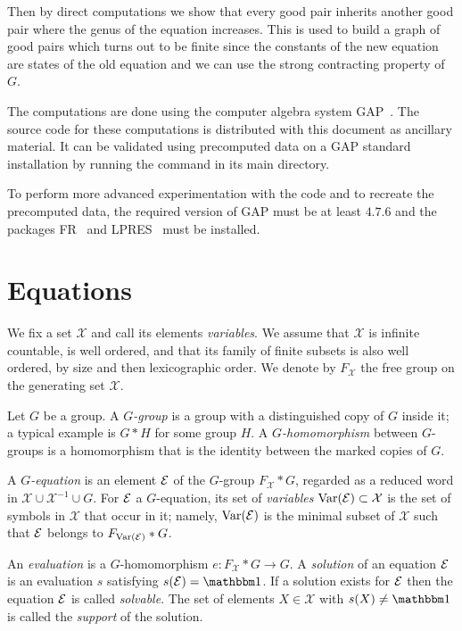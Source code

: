 \documentclass[a4paper,11pt]{amsart}
\begin{document}
Then by direct computations we show that every good pair inherits
another good pair where the genus of the equation increases.
This is used to build a graph of good pairs which turns out 
to be finite since the constants of the new equation are states
of the old equation and we can use the strong contracting property
of $G$. 

The computations are done
 using the computer algebra system GAP~\cite{GAP4}. The source
code for these computations is distributed with this document as
ancillary material. It can be validated using precomputed data on a
GAP standard installation by running the command  in its main directory.

To perform more advanced experimentation with the code and to recreate
the precomputed data, the required version of GAP must be at least
$4.7.6$ and the packages FR~\cite{FR2.3.6} and LPRES~\cite{LPRES0.3.0}
must be installed.

\section{Equations}
We fix a set $\mathcal{X}$ and call its elements \emph{variables}.  We
assume that $\mathcal{X}$ is infinite countable, is well ordered, and
that its family of finite subsets is also well ordered, by size and
then lexicographic order. We denote by $F_{\mathcal{X}}$ the free
group on the generating set $\mathcal{X}$.

\begin{defi}
  Let $G$ be a group. A \emph{$G$-group} is a group with a
  distinguished copy of $G$ inside it; a typical example is 
  $G*H$ for some group $H$. A \emph{$G$-homomorphism} 
  between $G$-groups is a homomorphism
  that is the identity between the marked copies of $G$.

  A \emph{$G$-equation} is an element $\mathcal{E}$ of the $G$-group
  $F_{\mathcal{X}} * G$, regarded as a reduced word in
  $\mathcal X\cup\mathcal X^{-1}\cup G$. For $\mathcal{E}$ a $G$-equation,
  its set of \emph{variables} $\textup{Var}(\mathcal{E})\subset \mathcal{X}$ is the
  set of symbols in $\mathcal{X}$ that occur in it; namely,
  $\textup{Var}(\mathcal{E})$ is the minimal subset of $\mathcal{X}$ such that
  $\mathcal{E}$ belongs to $F_{\textup{Var}(\mathcal{E})}*G$.

  An \emph{evaluation} is a $G$-homomorphism $e\colon F_{\mathcal{X}} * G \to G$.
  A \emph{solution} of an equation $\mathcal{E}$ is an evaluation $s$
  satisfying $s(\eq{E})=\id$. If a solution exists for $\mathcal{E}$ then the
  equation $\mathcal{E}$ is called \emph{solvable}. The set of elements
  $X\in \mathcal{X}$ with $s(X)\neq\id$ is called the \emph{support} of the solution.
\end{defi}
\end{document}
